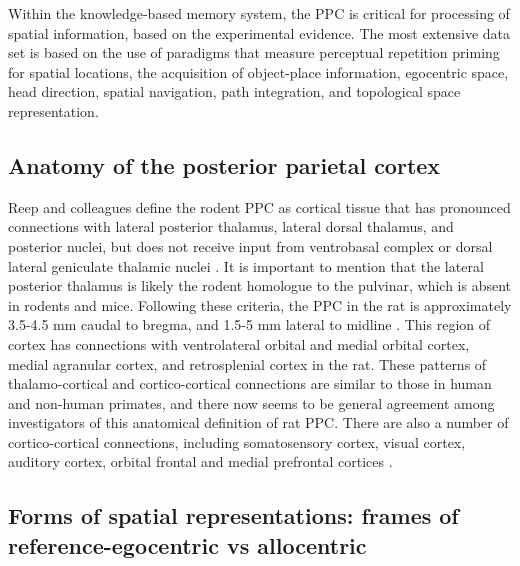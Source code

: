 \documentclass[doc, longtable]{apa6}
\begin{document}
Within the knowledge-based memory system, the PPC is critical for processing of spatial information, based on the experimental evidence. The most extensive data set is based on the use of paradigms that measure perceptual repetition priming for spatial locations, the acquisition of object-place information, egocentric space, head direction, spatial navigation, path integration, and topological space representation.

\subsection{Anatomy of the posterior parietal cortex}
Reep and colleagues define the rodent PPC as cortical tissue that has pronounced connections with lateral posterior thalamus, lateral dorsal thalamus, and posterior nuclei, but does not receive input from ventrobasal complex or dorsal lateral geniculate thalamic nuclei \parencite{Reep1994a}. It is important to mention that the lateral posterior thalamus is likely the rodent homologue to the pulvinar, which is absent in rodents and mice. Following these criteria, the PPC in the rat is approximately 3.5-4.5 mm caudal to bregma, and 1.5-5 mm lateral to midline \parencite{Reep1994a, Kesner2000c}. This region of cortex has connections with ventrolateral orbital and medial orbital cortex, medial agranular cortex, and retrosplenial cortex in the rat. These patterns of thalamo-cortical and cortico-cortical connections are similar to those in human and non-human primates, and there now seems to be general agreement among investigators of this anatomical definition of rat PPC. There are also a number of cortico-cortical connections, including somatosensory cortex, visual cortex, auditory cortex, orbital frontal and medial prefrontal cortices \parencite{Reep1994a}.

\subsection{Forms of spatial representations: frames of reference-egocentric vs allocentric}
\end{document}
